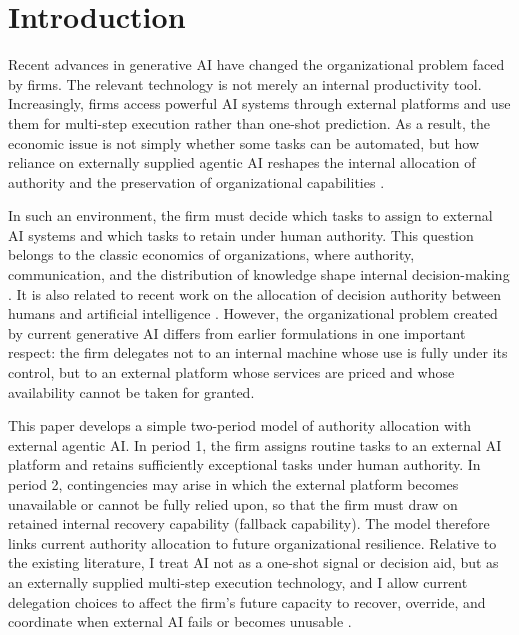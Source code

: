 \section{Introduction}

Recent advances in generative AI have changed the organizational problem faced by firms. The relevant technology is not merely an internal productivity tool. Increasingly, firms access powerful AI systems through external platforms and use them for multi-step execution rather than one-shot prediction. As a result, the economic issue is not simply whether some tasks can be automated, but how reliance on externally supplied agentic AI reshapes the internal allocation of authority and the preservation of organizational capabilities \citep{AgrawalGansGoldfarb2019,NzembayieUrbano2026}.

In such an environment, the firm must decide which tasks to assign to external AI systems and which tasks to retain under human authority. This question belongs to the classic economics of organizations, where authority, communication, and the distribution of knowledge shape internal decision-making \citep{AghionTirole1997,Dessein2002,Garicano2000}. It is also related to recent work on the allocation of decision authority between humans and artificial intelligence \citep{AtheyBryanGans2020}. However, the organizational problem created by current generative AI differs from earlier formulations in one important respect: the firm delegates not to an internal machine whose use is fully under its control, but to an external platform whose services are priced and whose availability cannot be taken for granted.

This paper develops a simple two-period model of authority allocation with external agentic AI. In period 1, the firm assigns routine tasks to an external AI platform and retains sufficiently exceptional tasks under human authority. In period 2, contingencies may arise in which the external platform becomes unavailable or cannot be fully relied upon, so that the firm must draw on retained internal recovery capability (fallback capability). The model therefore links current authority allocation to future organizational resilience. Relative to the existing literature, I treat AI not as a one-shot signal or decision aid, but as an externally supplied multi-step execution technology, and I allow current delegation choices to affect the firm's future capacity to recover, override, and coordinate when external AI fails or becomes unusable \citep{AgrawalGansGoldfarb2019,AtheyBryanGans2020,NzembayieUrbano2026}.

